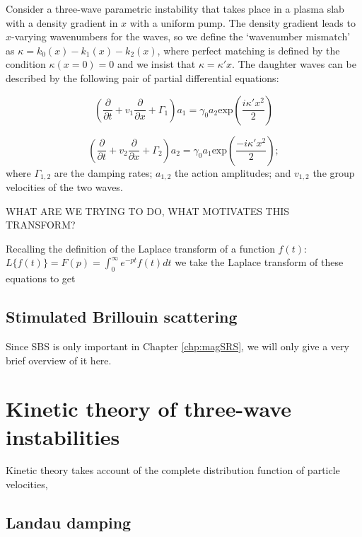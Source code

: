 Consider a three-wave parametric instability that takes place in a plasma slab with a density gradient in $x$ with a uniform pump. The density gradient leads to $x$-varying wavenumbers for the waves, so we define the `wavenumber mismatch' as $\kappa = k_0(x) - k_1(x) - k_2(x)$, where perfect matching is defined by the condition $\kappa(x=0) = 0$ and we insist that $\kappa = \kappa' x$. The daughter waves can be described by the following pair of partial differential equations:

\begin{equation}
 \left(\frac{\partial}{\partial t} + v_1\frac{\partial}{\partial x} + \Gamma_1 \right)a_1 = \gamma_0a_2\text{exp}\left(\frac{i\kappa'x^2}{2}\right)
\end{equation}

\begin{equation}
 \left(\frac{\partial}{\partial t} + v_2\frac{\partial}{\partial x} + \Gamma_2 \right)a_2 = \gamma_0a_1\text{exp}\left(\frac{-i\kappa'x^2}{2}\right);
\end{equation} 
where $\Gamma_{1,2}$ are the damping rates; $a_{1,2}$ the action amplitudes; and $v_{1,2}$ the group velocities of the two waves. 

WHAT ARE WE TRYING TO DO, WHAT MOTIVATES THIS TRANSFORM?

Recalling the definition of the Laplace transform of a function $f(t)$: $L\{f(t)\}= F(p) = \int_0^\infty e^{-pt} f(t) dt$ we take the Laplace transform of these equations to get






\subsection{Stimulated Brillouin scattering}
Since SBS is only important in Chapter \ref{chp:magSRS}, we will only give a very brief overview of it here.


\section{Kinetic theory of three-wave instabilities}

Kinetic theory takes account of the complete distribution function of particle velocities, 

\subsection{Landau damping}


